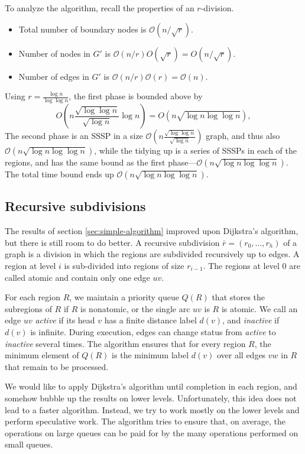 \documentclass[11pt]{article}
\begin{document}
To analyze the algorithm, recall the properties of an $r$-division.
\begin{itemize}
\item Total number of boundary nodes is $\mathcal{O}(n/\sqrt{r})$.
\item Number of nodes in $G'$ is $\mathcal{O}(n/r)O(\sqrt{r})=O(n/\sqrt{r})$.
\item Number of edges in $G'$ is $\mathcal{O}(n/r)\mathcal{O}(r) = \mathcal{O}(n)$.
\end{itemize}

Using $r=\frac{\log n}{\log \log n}$, the first phase is bounded above by
\[
  O\left(n\frac{\sqrt{\log \log n}}{\sqrt{\log n}} \log n\right)= O(n \sqrt{\log n \log \log n}),
\]
The second phase is an SSSP in a size $\mathcal{O}(n \frac{\sqrt{\log \log n}}{\sqrt{\log n}})$ graph, and thus also $\mathcal{O}(n \sqrt{\log n \log \log n})$, while the tidying up is a series of SSSPs in each of the regions, and has the same bound as the first phase---$\mathcal{O}(n \sqrt{\log n \log \log n})$. The total time bound ends up $\mathcal{O}(n \sqrt{\log n \log \log n})$.

\subsection{Recursive subdivisions}
\label{sec:recursion}

The results of section \ref{sec:simple-algorithm} improved upon Dijkstra's algorithm, but there is still room to do better. A recursive subdivision $\bar{r} = (r_0, \ldots, r_h)$ of a graph is a division in which the regions are subdivided recursively up to edges. A region at level $i$ is sub-divided into regions of size $r_{i-1}$. The regions at level $0$ are called atomic and contain only one edge $uv$.

For each region $R$, we maintain a priority queue $Q(R)$ that stores the subregions of $R$ if $R$ is nonatomic, or the single arc $uv$ is $R$ is atomic. We call an edge $uv$ \emph{active} if its head $v$ has a finite distance label $d(v)$, and \emph{inactive} if $d(v)$ is infinite. During execution, edges can change status from \emph{active} to \emph{inactive} several times. The algorithm ensures that for every region $R$, the minimum element of $Q(R)$ is the minimum label $d(v)$ over all edges $vw$ in $R$ that remain to be processed.

We would like to apply Dijkstra's algorithm until completion in each region, and somehow bubble up the results on lower levels. Unfortunately, this idea does not lead to a faster algorithm. Instead, we try to work mostly on the lower levels and perform speculative work. The algorithm tries to ensure that, on average, the operations on large queues can be paid for by the many operations performed on small queues.
\end{document}
